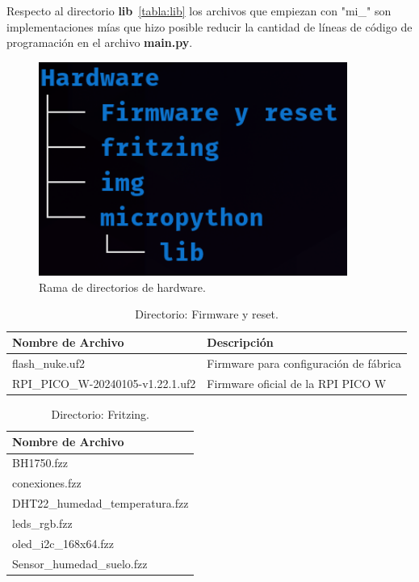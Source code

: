 Respecto al directorio \textbf{lib}~\ref{tabla:lib} los archivos que empiezan con "mi\_" son implementaciones mías que hizo posible reducir la cantidad de líneas de código de programación en el archivo \textbf{main.py}.

\begin{figure}[h]
\centering
\includegraphics[width=0.9\textwidth]{img/diagramas/directorios_hardware.png}
\caption{Rama de directorios de hardware.}
\end{figure}

\begin{table}[htbp]
\begin{center}
\caption{Directorio: Firmware y reset.}
\begin{tabular}{|l|l|} %
\hline
\rowcolor[HTML]{C0C0C0} 
\textbf{Nombre de Archivo} & \textbf{Descripción}\\ \hline
flash\_nuke.uf2 & Firmware para configuración de fábrica\\ \hline
RPI\_PICO\_W-20240105-v1.22.1.uf2 & Firmware oficial de la RPI PICO W\\ \hline
\end{tabular}
\end{center}
\end{table}

\begin{table}[htbp]
\begin{center}
	\caption{Directorio: Fritzing.}
\begin{tabular}{|l|} %
\hline
\rowcolor[HTML]{C0C0C0} 
\textbf{Nombre de Archivo}\\ \hline
BH1750.fzz  \\ \hline
conexiones.fzz  \\ \hline
DHT22\_humedad\_temperatura.fzz  \\ \hline
leds\_rgb.fzz  \\ \hline
oled\_i2c\_168x64.fzz  \\ \hline
Sensor\_humedad\_suelo.fzz \\ \hline
\end{tabular}
\label{tabla:fritzing}
\end{center}
\end{table}

